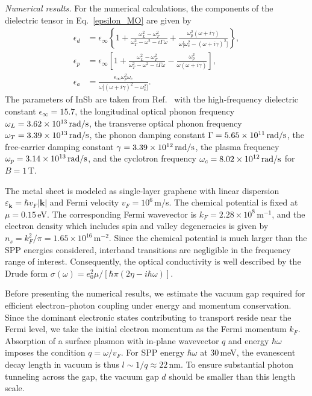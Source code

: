 \documentclass[aps,prl,twocolumn,longbibliography]{revtex4-2}
\begin{document}
{\it Numerical results.}
For the numerical calculations,
the components of the dielectric tensor in Eq.~\eqref{epsilon_MO} are given by
\begin{align*}
  \epsilon_d &= \epsilon_{\infty} \left\{ 1+ \frac{\omega_L^2 -\omega_T^2}{\omega_T^2
  -\omega^2 -i\Gamma\omega} + \frac{\omega_p^2(\omega+i\gamma)}{\omega\big[
\omega_c^2-(\omega+i\gamma)^2 \big]} \right\}, \\
  \epsilon_p &= \epsilon_{\infty} \left[ 1+ \frac{\omega_L^2 -\omega_T^2}{\omega_T^2
  -\omega^2 -i\Gamma\omega} - \frac{\omega_p^2}{\omega(\omega+i\gamma)} \right], \\
  \epsilon_a &= \frac{\epsilon_{\infty}\omega_p^2\omega_c}{\omega\big[ (\omega+i\gamma)^2
  -\omega_c^2 \big]} .
\end{align*}
The parameters of InSb are taken from Ref.~\cite{InSb_76} with
the high-frequency dielectric constant $\epsilon_\infty = 15.7$,
the longitudinal optical phonon frequency $\omega_L = 3.62\times 10^{13}\,{\rm rad/s}$,
the transverse optical phonon frequency $\omega_T = 3.39\times 10^{13}\,{\rm rad/s}$,
the phonon damping constant $\Gamma = 5.65\times 10^{11}\,{\rm rad/s}$,
the free-carrier damping constant $\gamma = 3.39\times 10^{12}\,{\rm rad/s}$,
the plasma frequency $\omega_p = 3.14\times 10^{13}\,{\rm rad/s}$, and
the cyclotron frequency $\omega_c = 8.02\times 10^{12}\,{\rm rad/s}$ for $B=1\,$T.

The metal sheet is modeled as single-layer graphene with linear dispersion
$\varepsilon_{\bm{k}} = \hbar v_F |\bm{k}|$ and Fermi velocity $v_F = 10^6\,$m/s. The
chemical potential is fixed at $\mu = 0.15\,$eV. The corresponding Fermi wavevector is
$k_F=2.28\times 10^8\,$m$^{-1}$, and the electron density which includes spin and valley
degeneracies is given by $n_s = k_F^2/\pi = 1.65\times 10^{16}\,$m$^{-2}$. Since the
chemical potential is much larger than the SPP energies considered, interband transitions
are negligible in the frequency range of interest. Consequently, the optical conductivity
is well described by the Drude form
$\sigma(\omega)= e_0^2 \mu /[\hbar \pi (2\eta -i\hbar\omega)]$.

Before presenting the numerical results, we estimate the vacuum gap required for efficient
electron–photon coupling under energy and momentum conservation. Since the dominant
electronic states contributing to transport reside near the Fermi level, we take the
initial electron momentum as the Fermi momentum $k_F$. Absorption of a surface plasmon
with in-plane wavevector $q$ and energy $\hbar\omega$ imposes the condition
$q=\omega /v_F$. For SPP energy $\hbar\omega$ at $30\,$meV, the evanescent decay length in
vacuum is thus $l \sim 1/q \approx 22\,$nm. To ensure substantial photon tunneling across
the gap, the vacuum gap $d$ should be smaller than this length scale.
\end{document}
